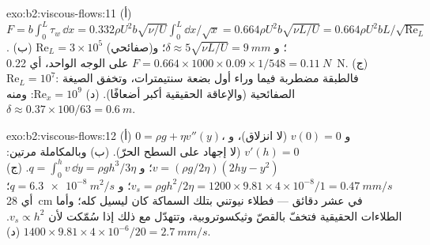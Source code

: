 \begin{solution}{exo:b2:viscous-flows:11}
(أ) $F = b\int_0^L\tau_w\,\dd x = 0.332\rho U^2b\sqrt{\nu/U}\int_0^L\dd x/\sqrt x =
0.664\rho U^2b\sqrt{\nu L/U} = 0.664\rho U^2bL/\sqrt{\mathrm{Re}_L}$. (ب) $\mathrm{Re}_L =
3 \times 10^5$ (صفائحي)؛ و $\delta \approx 5\sqrt{\nu L/U} = \qty{9}{mm}$؛ و $F = 0.664 \times 1000
\times 0.09 \times 1/548 = \qty{0.11}{N}$ على الوجه الواحد، أي \qty{0.22}{N}. (ج) $\mathrm{Re}_L = 10^7$:
فالطبقة مضطربة فيما وراء أول بضعة سنتيمترات، وتخفق الصيغة
الصفائحية (والإعاقة الحقيقية أكبر أضعافًا). (د) $\mathrm{Re}_x =
10^9$: ومنه $\delta \approx 0.37 \times 100/63 = \qty{0.6}{m}$.
\end{solution}

\begin{solution}{exo:b2:viscous-flows:12}
(أ) $0 = \rho g + \eta v''(y)$، و $v(0) = 0$ (لا انزلاق)، و $v'(h) = 0$ (لا إجهاد على
السطح الحرّ). (ب) وبالمكاملة مرتين: $v = (\rho g/2\eta)(2hy - y^2)$؛ و $q =
\int_0^hv\,\dd y = \rho gh^3/3\eta$. (ج) $v_s = \rho gh^2/2\eta = 1200 \times 9.81 \times
4 \times 10^{-8}/1 = \qty{0.47}{mm/s}$؛ و $q = \qty{6.3e-8}{m^2/s}$؛ أي \qty{28}{cm} في عشر
دقائق --- فطلاء نيوتني بتلك السماكة كان ليسيل كله؛ وأما
الطلاءات الحقيقية فتخفّ بالقصّ وثيكسوتروبية، وتتهدّل مع ذلك إذا سُمّكت
لأن $v_s \propto h^2$. (د) $1400 \times 9.81 \times 4 \times 10^{-6}/20 = \qty{2.7}{mm/s}$.
\end{solution}

